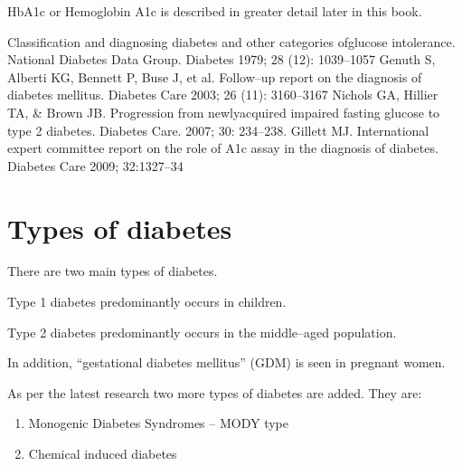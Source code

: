 HbA1c or Hemoglobin A1c is described in greater detail later in this book.

\begin{thebibliography}{99}
 Classification and diagnosing diabetes and other categories of\break glucose intolerance. National Diabetes Data Group. Diabetes 1979; 28 (12): 1039–1057
  Genuth S, Alberti KG, Bennett P, Buse J, et al. Follow–up report on the diagnosis of diabetes mellitus. Diabetes Care 2003; 26 (11): 3160–3167
  Nichols GA, Hillier TA, \& Brown JB. Progression from newly\break acquired impaired fasting glucose to type 2 diabetes. Diabetes Care. 2007; 30: 234–238.
  Gillett MJ. International expert committee report on the role of A1c assay in the diagnosis of diabetes. Diabetes Care 2009; 32:1327–34
 \end{thebibliography}


\chapter{Types of diabetes}\label{chap6}

There are two main types of diabetes.

Type 1 diabetes predominantly occurs in children.

Type 2 diabetes predominantly occurs in the middle–aged popu\-lation.

In addition, “gestational diabetes mellitus” (GDM) is seen in pregnant women.

As per the latest research two more types of diabetes are added. They are:

\begin{enumerate}[-]
\itemsep=0pt
\item Monogenic Diabetes Syndromes – MODY type
\item Chemical induced diabetes
\end{enumerate}

